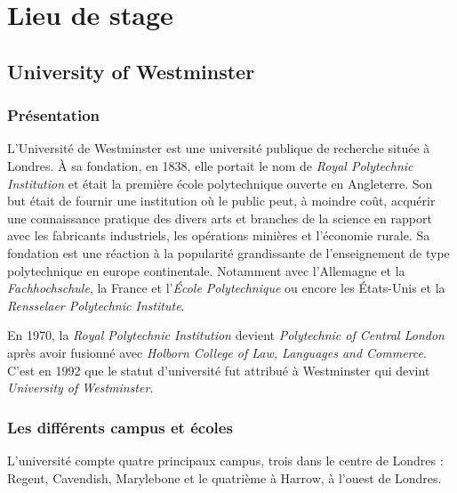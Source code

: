 \chapter{Lieu de stage}

\section{University of Westminster}

\subsection{Pr\'esentation}

L'Universit\'e de Westminster est une universit\'e publique de recherche situ\'ee \`a Londres. 
\`A sa fondation, en 1838, elle portait le nom de \textit{Royal Polytechnic Institution} et \'etait la premi\`ere \'ecole polytechnique ouverte en Angleterre.
Son but \'etait de fournir une institution o\`u le public peut, \`a moindre co\^ut, acqu\'erir une connaissance pratique des divers arts et branches de la science en rapport avec les fabricants industriels, les op\'erations mini\`eres et l'\'economie rurale.
Sa fondation est une r\'eaction \`a la popularit\'e grandissante de l'enseignement de type polytechnique en europe continentale. 
Notamment avec l'Allemagne et la \textit{Fachhochschule}, la France et l'\textit{\'Ecole Polytechnique} ou encore les \'Etats-Unis et la \textit{Rensselaer Polytechnic Institute}.

En 1970, la \textit{Royal Polytechnic Institution} devient \textit{Polytechnic of Central London} apr\`es avoir fusionn\'e avec \textit{Holborn College of Law, Languages and Commerce}.
C'est en 1992 que le statut d'universit\'e fut attribu\'e \`a Westminster qui devint \textit{University of Westminster}.

\subsection{Les diff\'erents campus et \'ecoles}
\label{section:campus}

L'universit\'e compte quatre principaux campus, trois dans le centre de Londres : Regent, Cavendish, Marylebone et le quatri\`eme \`a Harrow, \`a l'ouest de Londres.

